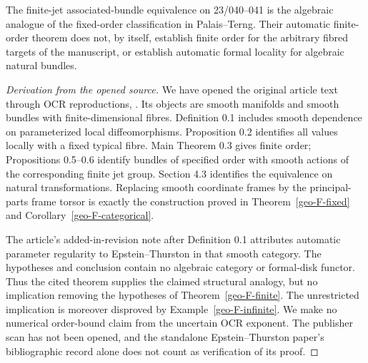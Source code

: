 \begin{proposition}
\label{geo-F-comparison}
The finite-jet associated-bundle equivalence on 23/040--041 is the
algebraic analogue of the fixed-order classification in Palais--Terng.
Their automatic finite-order theorem does not, by itself, establish finite
order for the arbitrary fibred targets of the manuscript, or establish
automatic formal locality for algebraic natural bundles.
\end{proposition}
\begin{proof}[Derivation from the opened source]
We have opened the original article text through OCR reproductions,
\cite[Definition 0.1, Proposition 0.2, Main Theorem 0.3,
Propositions 0.5--0.6, and \S4.3]{PalaisTerng1977}. Its objects are smooth
manifolds and smooth bundles with finite-dimensional fibres. Definition 0.1
includes smooth dependence on parameterized local diffeomorphisms.
Proposition 0.2 identifies all values locally with a fixed typical fibre.
Main Theorem 0.3 gives finite order; Propositions 0.5--0.6 identify bundles
of specified order with smooth actions of the corresponding finite jet
group. Section 4.3 identifies the equivalence on natural transformations.
Replacing smooth coordinate frames by the principal-parts frame torsor is
exactly the construction proved in Theorem~\ref{geo-F-fixed} and
Corollary~\ref{geo-F-categorical}.

The article's added-in-revision note after Definition 0.1 attributes
automatic parameter regularity to Epstein--Thurston in that smooth
category. The hypotheses and conclusion contain no algebraic category or
formal-disk functor. Thus the cited theorem supplies the claimed structural
analogy, but no implication removing the hypotheses of
Theorem~\ref{geo-F-finite}. The unrestricted implication is moreover
disproved by Example~\ref{geo-F-infinite}. We make no numerical order-bound
claim from the uncertain OCR exponent. The publisher scan has not been
opened, and the standalone Epstein--Thurston paper's bibliographic record
alone does not count as verification of its proof.
\end{proof}
